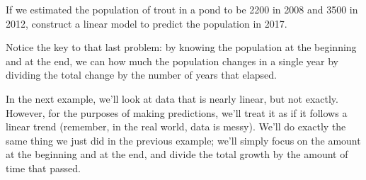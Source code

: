 \begin{try}
If we estimated the population of trout in a pond to be 2200 in 2008 and 3500 in 2012, construct a linear model to predict the population in 2017.
\end{try}

Notice the key to that last problem: by knowing the population at the beginning and at the end, we can how much the population changes in a single year by dividing the total change by the number of years that elapsed.

In the next example, we'll look at data that is nearly linear, but not exactly.  However, for the purposes of making predictions, we'll treat it as if it follows a linear trend (remember, in the real world, data is messy).  We'll do exactly the same thing we just did in the previous example; we'll simply focus on the amount at the beginning and at the end, and divide the total growth by the amount of time that passed.
\vfill
\pagebreak

